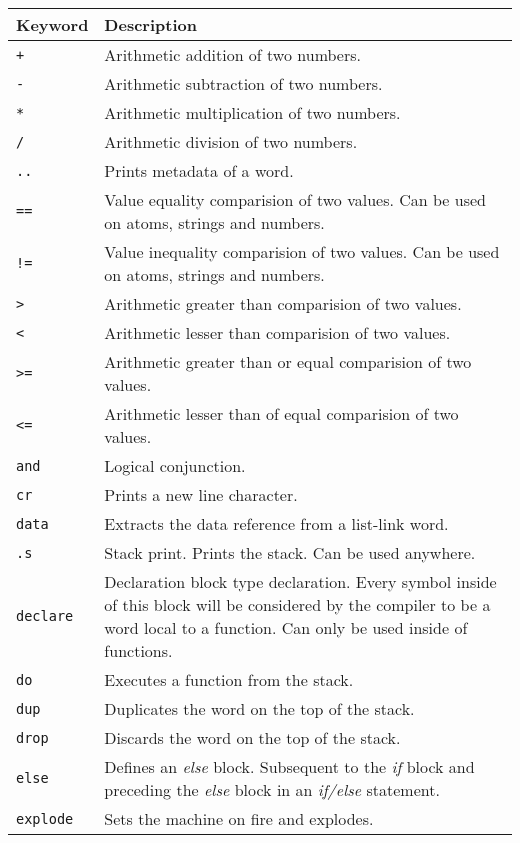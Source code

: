 \documentclass[12pt]{article}
\begin{document}
\begin{center}
\begin{tabular}{ | l | p{9cm} | }
\hline
\textbf{Keyword} & \textbf{Description} \\ \hline

\verb|+| & Arithmetic addition of two numbers. \\ \hline
\verb|-| & Arithmetic subtraction of two numbers. \\ \hline
\verb|*| & Arithmetic multiplication of two numbers. \\ \hline
\verb|/| & Arithmetic division of two numbers. \\ \hline
\verb|..| & Prints metadata of a word. \\ \hline
\verb|==| & Value equality comparision of two values. Can be used on atoms, strings and numbers. \\ \hline
\verb|!=| & Value inequality comparision of two values. Can be used on atoms, strings and numbers. \\ \hline
\verb|>| & Arithmetic greater than comparision of two values. \\ \hline
\verb|<| & Arithmetic lesser than comparision of two values. \\ \hline
\verb|>=| & Arithmetic greater than or equal comparision of two values. \\ \hline
\verb|<=| & Arithmetic lesser than of equal comparision of two values. \\ \hline
\verb|and| & Logical conjunction. \\ \hline
\verb|cr| & Prints a new line character. \\ \hline
\verb|data| & Extracts the data reference from a list-link word. \\ \hline
\verb|.s| & Stack print. Prints the stack. Can be used anywhere. \\ \hline
\verb|declare| & Declaration block type declaration. Every symbol inside of this block will be considered by the compiler to be a word local to a function. 
	Can only be used inside of functions. \\ \hline
\verb|do| & Executes a function from the stack. \\ \hline
\verb|dup| & Duplicates the word on the top of the stack. \\ \hline
\verb|drop| & Discards the word on the top of the stack. \\ \hline
\verb|else| & Defines an \emph{else} block. Subsequent to the \emph{if} block and preceding the \emph{else} block in an \emph{if/else} statement. \\ \hline
\verb|explode| & Sets the machine on fire and explodes. \\ \hline


\end{tabular}
\end{center}
\end{document}
